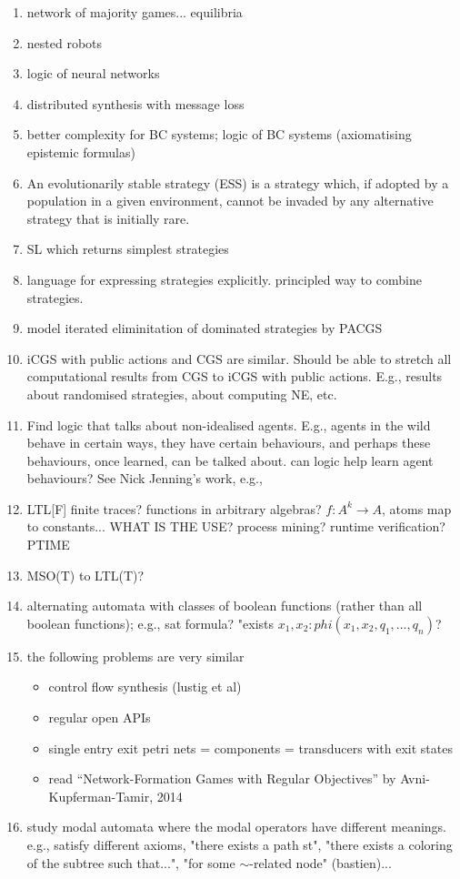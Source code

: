\documentclass[a4paper,10pt]{article}
\begin{document}
\begin{enumerate} 
\item network of majority games... equilibria
\item nested robots
\item logic of neural networks
\item distributed synthesis with message loss
\item better complexity for BC systems; logic of BC systems (axiomatising epistemic
formulas)
\item An evolutionarily stable strategy (ESS) is a strategy which, if adopted by a
population in a given environment, cannot be invaded by any alternative strategy
that is initially rare. 
\item SL which returns simplest strategies
\item language for expressing strategies explicitly. principled way to combine
strategies.

\item model iterated eliminitation of dominated strategies by PACGS

\item iCGS with public actions and CGS are similar. Should be able to stretch all computational results from CGS to iCGS with public actions. E.g., results about randomised strategies, about computing NE, etc. 

\item Find logic that talks about non-idealised agents. E.g., agents in the wild behave in certain ways, they have certain behaviours, and perhaps these behaviours, once learned, can be talked about. can logic help learn agent behaviours? See Nick Jenning's work, e.g., 

 \item 
LTL[F] 
finite traces?
functions in arbitrary algebras? $f:A^k \to A$, atoms map to constants... WHAT IS THE USE?
process mining?
runtime verification? PTIME

\item MSO(T) to  LTL(T)?


\item 
alternating automata with classes of boolean functions (rather than all boolean functions);
e.g., sat formula? "exists $x_1, x_2: phi(x_1,x_2,q_1,...,q_n)$?

\item 
the following problems are very similar
\begin{itemize}
\item control flow synthesis (lustig et al) 
\item regular open APIs
\item single entry exit petri nets = components = transducers with exit states
\item 	read “Network-Formation Games with
Regular Objectives” by Avni-Kupferman-Tamir,
2014
\end{itemize}
\item
study modal automata where the modal operators have different meanings.
e.g., satisfy different axioms, "there exists a path st", "there exists a coloring of the subtree such that...",
"for some $\sim$-related node" (bastien)...


\end{enumerate}
\end{document}

